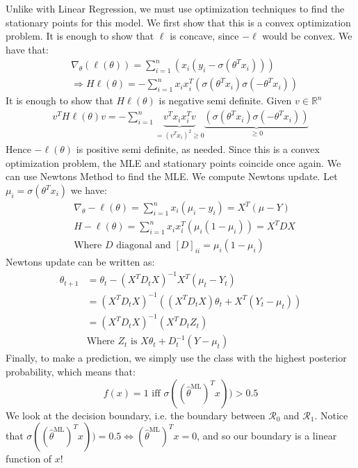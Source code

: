 \documentclass[]{article}
\theoremstyle{mattstyle}
\theoremstyle{definition}
\begin{document}
Unlike with Linear Regression, we must use optimization techniques to find the stationary points for this model. We first show that this is a convex optimization problem. It is enough to show that $\ell$ is concave, since $-\ell$ would be convex. We have that:
\begin{align*}
&\nabla_{\theta} (\ell(\theta)) =\sum_{i=1}^n\left( x_i(y_i - \sigma(\theta^Tx_i)) \right)\\
&\Rightarrow H\ell(\theta)= -\sum_{i=1}^n x_ix_i^T\left(\sigma(\theta^Tx_i)\sigma(-\theta^Tx_i) \right)
\end{align*}
It is enough to show that $H\ell(\theta)$ is negative semi definite. Given $v\in\mathbb{R}^n$
\begin{align*}
v^TH\ell(\theta)v=-\sum_{i=1}^n \underbrace{v^Tx_ix_i^Tv}_{=(v^Tx_i)^2 \ge 0} \underbrace{\left(\sigma(\theta^Tx_i)\sigma(-\theta^Tx_i) \right)}_{\ge 0}
\end{align*}
Hence $-\ell(\theta)$ is positive semi definite, as needed. Since this is a convex optimization problem, the MLE and stationary points coincide once again. We can use Newtons Method to find the MLE. We compute Newtons update. Let $\mu_i = \sigma(\theta^Tx_i)$ we have:
\begin{align*}
&\nabla_{\theta} -\ell(\theta) = \sum_{i=1}^n x_i (\mu_i - y_i)=X^T(\mu-Y)\\
&H-\ell(\theta) = \sum_{i=1}^n x_ix_i^T\left(\mu_i(1-\mu_i) \right)=X^TDX\\
&\text{Where $D$ diagonal and } [D]_{ii}=\mu_i(1-\mu_i)
\end{align*}
Newtons update can be written as:
\begin{align*}
\theta_{t+1} &= \theta_t - (X^TD_tX)^{-1}X^T(\mu_t-Y_t)\\
&= (X^TD_tX)^{-1}\left((X^TD_tX)\theta_t + X^T(Y_t-\mu_t)\right)\\
&= (X^TD_tX)^{-1}\left( X^TD_tZ_t\right)\\
&\text{Where $Z_t$ is $X\theta_t+D^{-1}_t(Y-\mu_t)$}
\end{align*}
Finally, to make a prediction, we simply use the class with the highest posterior probability, which means that:
$$f(x)=1 \text{ iff } \sigma((\hat{\theta}^{\text{ML}})^Tx))>0.5 $$
We look at the decision boundary, i.e. the boundary between $\mathcal{R}_0$ and $\mathcal{R}_1$. Notice that $\sigma((\hat{\theta}^{\text{ML}})^Tx))=0.5 \iff (\hat{\theta}^{\text{ML}})^Tx = 0$, and so our boundary is a linear function of $x$!

\newpage
\end{document}
